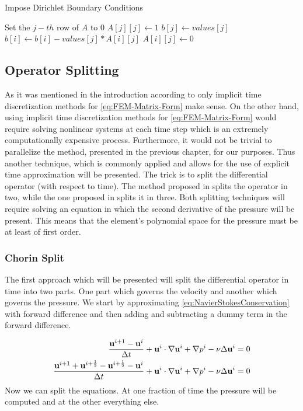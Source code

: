 \begin{algorithm}[H]
\centering
\caption{Impose Dirichlet Boundary Conditions}\label{alg:impose-diriclet}
\begin{algorithmic}[1]
				\State Set the $j-th$ row of $A$ to 0
				\State $A[j][j] \gets 1$
				\State $b[j] \gets values[j]$
					\State $b[i] \gets b[i] - values[j]*A[i][j]$
					\State $A[i][j] \gets 0$
				\EndFor
			\EndFor
		\EndProcedure
\end{algorithmic}
\end{algorithm}

\subsection{Operator Splitting}
As it was mentioned in the introduction according to \cite{gresho-fem} only implicit time discretization methods for \cref{eq:FEM-Matrix-Form} make sense. On the other hand, using implicit time discretization methods for \cref{eq:FEM-Matrix-Form} would require solving nonlinear systems at each time step which is an extremely computationally expensive process. Furthermore, it would not be trivial to parallelize the method, presented in the previous chapter, for our purposes. Thus another technique, which is commonly applied and allows for the use of explicit time approximation will be presented. The trick is to split the differential operator (with respect to time). The method proposed in \cite{Chorin-operator-split} splits the operator in two, while the one proposed in \cite{Bridson} splits it in three. Both splitting techniques will require solving an equation in which the second derivative of the pressure will be present. This means that the element's polynomial space for the pressure must be at least of first order.

\subsubsection{Chorin Split}
The first approach which will be presented will split the differential operator in time into two parts. One part which governs the velocity and another which governs the pressure. We start by approximating \cref{eq:NavierStokesConservation} with forward difference and then adding and subtracting a dummy term in the forward difference.

\begin{align*}
	\frac{\mathbf{u}^{i+1} - \mathbf{u}^{i}}{\Delta t} + \mathbf{u}^i \cdot \nabla\mathbf{u}^i + \nabla p^i - \nu \Delta \mathbf{u}^i &= 0 \\
		\frac{\mathbf{u}^{i+1} + \mathbf{u}^{i+\frac{1}{2}} - \mathbf{u}^{i+\frac{1}{2}} - \mathbf{u}^{i}}{\Delta t} + \mathbf{u}^i \cdot \nabla\mathbf{u}^i + \nabla p^i - \nu \Delta \mathbf{u}^i &= 0
\end{align*}
Now we can split the equations. At one fraction of time the pressure will be computed and at the other everything else.


